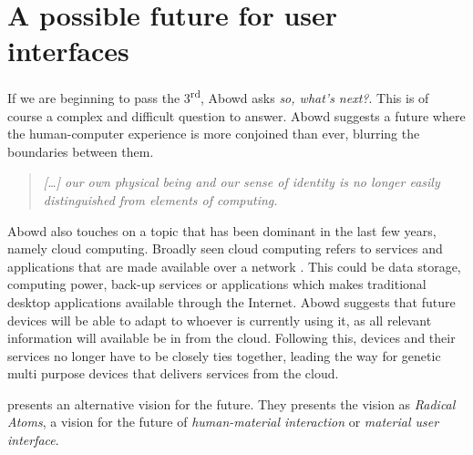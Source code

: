 \section{A possible future for user interfaces}
If we are beginning to pass the 3\textsuperscript{rd}, Abowd asks \textit{so, what's next?}.
This is of course a complex and difficult question to answer.
Abowd suggests a future where the human-computer experience is more conjoined than ever, blurring the boundaries between them.
\begin{quote}
\emph{[\ldots] our own physical being and our sense of identity is no longer easily distinguished from elements of computing.}
\end{quote}
Abowd also touches on a topic that has been dominant in the last few years, namely cloud computing.
Broadly seen cloud computing refers to services and applications that are made available over a network .
This could be data storage, computing power, back-up services or applications which makes traditional desktop applications available through the Internet.
Abowd suggests that future devices will be able to adapt to whoever is currently using it, as all relevant information will available be in from the cloud.
Following this, devices and their services no longer have to be closely ties together, leading the way for genetic multi purpose devices that delivers services from the cloud.

\citet{ishii2012radical} presents an alternative vision for the future.
They presents the vision as \textit{Radical Atoms}, a vision for the future of \textit{human-material interaction} or \textit{material user interface}. 

